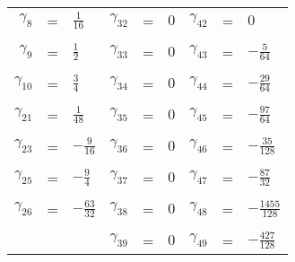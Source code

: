 \documentclass{article}
\begin{document}
\begin{table}[!hp]
\begin{center}
\begin{tabular}{rclrclrcl}
 $\gamma_{8}$  & = & $ \frac{1}{16}   $        & $\gamma_{32}$ & = & $ 0 $    & $\gamma_{42}$ & = & $ 0                  $ \\
               &   &                           &               &   &          &               &   &                        \\
 $\gamma_{9}$  & = & $ \frac{1}{2}    $        & $\gamma_{33}$ & = & $ 0 $    & $\gamma_{43}$ & = & $ -\frac{5}{64}      $ \\
               &   &                           &               &   &          &               &   &                        \\
 $\gamma_{10}$ & = & $ \frac{3}{4}    $        & $\gamma_{34}$ & = & $ 0 $    & $\gamma_{44}$ & = & $ -\frac{29}{64}     $ \\
               &   &                           &               &   &          &               &   &                        \\
 $\gamma_{21}$ & = & $ \frac{1}{48}   $        & $\gamma_{35}$ & = & $ 0 $    & $\gamma_{45}$ & = & $ -\frac{97}{64}     $ \\
               &   &                           &               &   &          &               &   &                        \\
 $\gamma_{23}$ & = & $ -\frac{9}{16}  $        & $\gamma_{36}$ & = & $ 0 $    & $\gamma_{46}$ & = & $ -\frac{35}{128}    $ \\
               &   &                           &               &   &          &               &   &                        \\
 $\gamma_{25}$ & = & $ -\frac{9}{4}   $        & $\gamma_{37}$ & = & $ 0 $    & $\gamma_{47}$ & = & $ -\frac{87}{32}     $ \\
               &   &                           &               &   &          &               &   &                        \\
 $\gamma_{26}$ & = & $ -\frac{63}{32} $        & $\gamma_{38}$ & = & $ 0 $    & $\gamma_{48}$ & = & $ -\frac{1455}{128}  $ \\
               &   &                           &               &   &          &               &   &                        \\
               &   &                           & $\gamma_{39}$ & = & $ 0 $    & $\gamma_{49}$ & = & $ -\frac{427}{128}   $ \\

\end{tabular}
\end{center}
\end{table}
\end{document}
